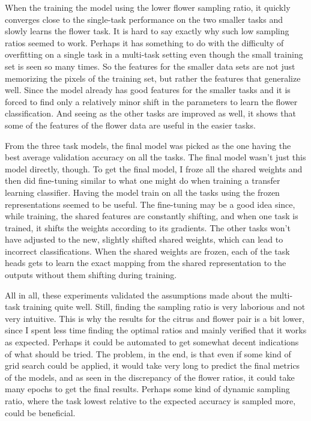 When the training the model using the lower flower sampling ratio, it quickly converges close to the single-task performance on the two smaller tasks and slowly learns the flower task.
It is hard to say exactly why such low sampling ratios seemed to work.
Perhaps it has something to do with the difficulty of overfitting on a single task in a multi-task setting even though the small training set is seen so many times.
So the features for the smaller data sets are not just memorizing the pixels of the training set, but rather the features that generalize well.
Since the model already has good features for the smaller tasks and it is forced to find only a relatively minor shift in the parameters to learn the flower classification.
And seeing as the other tasks are improved as well, it shows that some of the features of the flower data are useful in the easier tasks.

From the three task models, the final model was picked as the one having the best average validation accuracy on all the tasks.
The final model wasn't just this model directly, though.
To get the final model, I froze all the shared weights and then did fine-tuning similar to what one might do when training a transfer learning classifier.
Having the model train on all the tasks using the frozen representations seemed to be useful.
The fine-tuning may be a good idea since, while training, the shared features are constantly shifting, and when one task is trained, it shifts the weights according to its gradients.
The other tasks won't have adjusted to the new, slightly shifted shared weights, which can lead to incorrect classifications.
When the shared weights are frozen, each of the task heads gets to learn the exact mapping from the shared representation to the outputs without them shifting during training.

All in all, these experiments validated the assumptions made about the multi-task training quite well.
Still, finding the sampling ratio is very laborious and not very intuitive.
This is why the results for the citrus and flower pair is a bit lower, since I spent less time finding the optimal ratios and mainly verified that it works as expected.
Perhaps it could be automated to get somewhat decent indications of what should be tried.
The problem, in the end, is that even if some kind of grid search could be applied, it would take very long to predict the final metrics of the models, and as seen in the discrepancy of the flower ratios, it could take many epochs to get the final results.
Perhaps some kind of dynamic sampling ratio, where the task lowest relative to the expected accuracy is sampled more, could be beneficial.

